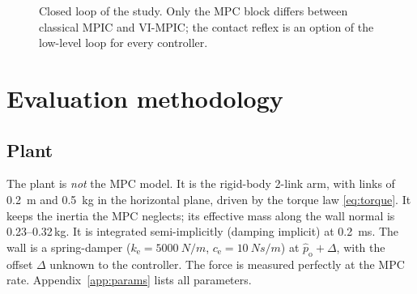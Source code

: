 \documentclass[11pt,a4paper]{article}
\newcommand{\qd}{q_{\mathrm{d}}}
\newcommand{\dqd}{\dot{q}_{\mathrm{d}}}
\newcommand{\phat}{\hat{p}_{\mathrm{o}}}
\newcommand{\ke}{k_{\mathrm{e}}}
\begin{document}
\begin{figure}[!htbp]
\centering
{}
\caption{Closed loop of the study. Only the MPC block differs between classical MPIC and VI-MPIC; the
contact reflex is an option of the low-level loop for every controller.}
\label{fig:structure}
\end{figure}

\section{Evaluation methodology}\label{sec:eval}

\subsection{Plant}
The plant is \emph{not} the MPC model. It is the rigid-body 2-link arm, with links of \SI{0.2}{m} and
\SI{0.5}{kg} in the horizontal plane, driven by the torque law \eqref{eq:torque}. It keeps the inertia the
MPC neglects; its effective mass along the wall normal is 0.23--0.32\,kg. It is integrated semi-implicitly
(damping implicit) at \SI{0.2}{ms}. The wall is a spring-damper ($\ke=\SI{5000}{N/m}$,
$c_\mathrm{e}=\SI{10}{Ns/m}$) at $\phat+\Delta$, with the offset $\Delta$ unknown to the controller. The
force is measured perfectly at the MPC rate. Appendix~\ref{app:params} lists all parameters.
\end{document}
